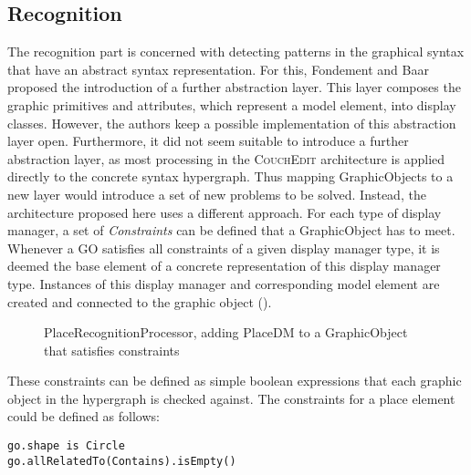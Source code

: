 \subsection{Recognition}
\label{sec:recognition}
The recognition part is concerned with detecting patterns in the graphical syntax that have an abstract syntax representation. For this, Fondement and Baar proposed the introduction of a further abstraction layer. This layer composes the graphic primitives and attributes, which represent a model element, into display classes. However, the authors keep a possible implementation of this abstraction layer open. Furthermore, it did not seem suitable to introduce a further abstraction layer, as most processing in the \textsc{CouchEdit} architecture is applied directly to the concrete syntax hypergraph. Thus mapping GraphicObjects to a new layer would introduce a set of new problems to be solved. Instead, the architecture proposed here uses a different approach. For each type of display manager, a set of \emph{Constraints} can be defined that a GraphicObject has to meet. Whenever a GO satisfies all constraints of a given display manager type, it is deemed the base element of a concrete representation of this display manager type. Instances of this display manager and corresponding model element are created and connected to the graphic object ().


\begin{figure}
  \centering
  
  \caption{PlaceRecognitionProcessor, adding PlaceDM to a GraphicObject that satisfies constraints}
  \label{fig:place-recognition}
\end{figure}

These constraints can be defined as simple boolean expressions that each graphic object in the hypergraph is checked against. The constraints for a place element could be defined as follows:

\begin{lstlisting}[language=OCL,caption={Possible constraints to detect GOs representing a place},captionpos=b]
go.shape is Circle
go.allRelatedTo(Contains).isEmpty()
\end{lstlisting}

